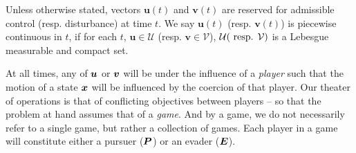 Unless otherwise stated, vectors $\bm{u}(t)$ and $\bm{v}(t)$ are reserved for admissible control (resp. disturbance) at time $t$. We say $\bm{u}(t)$ (resp. $\bm{v}(t)$) is piecewise continuous in $t$, if for each $t$, $\bm{u} \in \mathcal{U}$ (resp. $\bm{v} \in \mathcal{V}$), $\mathcal{U}(\text{ resp. } \mathcal{V})$ is a Lebesgue measurable and compact set. 

At all times, any of $\bm{u}$ or $\bm{v}$ will be under the influence of a \textit{player} such that the motion of a state $\bm{x}$ will be influenced by the coercion of that player. Our theater of operations is that of conflicting objectives between players -- so that the problem at hand assumes that of a \textit{game}. And by a game, we do not necessarily refer to a single game, but rather a collection of games.  Each player in a game will constitute either a pursuer ($\bm{P}$) or an evader ($\bm{E}$).  %
%

